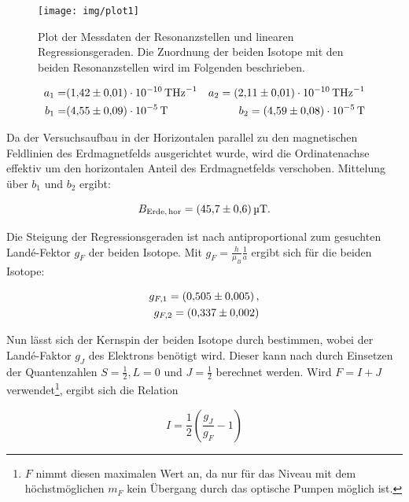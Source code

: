 \begin{figure}
	\centering
	\caption{Plot der Messdaten der Resonanzstellen und linearen Regressionsgeraden. Die Zuordnung der beiden Isotope mit den beiden Resonanzstellen wird im Folgenden beschrieben.}
	\texttt{[image: img/plot1]}
	\label{fig:plot1}
\end{figure}





\begin{eqnarray}
	a_1 =& \SI{1.42 \pm 0.01 e-10}{\tesla \hertz^{-1}} &a_2 =  \SI{2.11 \pm 0.01 e-10}{\tesla \hertz^{-1}}\\
	b_1 =& \SI{4.55 \pm 0.09 e-5}{\tesla}  &b_2 = \SI{4.59 \pm 0.08 e-5}{\tesla} 
\end{eqnarray}

Da der Versuchsaufbau in der Horizontalen parallel zu den magnetischen Feldlinien des Erdmagnetfelds ausgerichtet wurde, wird die Ordinatenachse effektiv um den horizontalen Anteil des Erdmagnetfelds verschoben. Mittelung über $b_1$ und $b_2$ ergibt:

\begin{equation}
	B_\text{Erde,\,hor} = \SI{45.7\pm 0.6}{\micro \tesla}.
\end{equation}

Die Steigung der Regressionsgeraden ist nach \color{red}{Gleichung ABC} antiproportional zum gesuchten Landé-Fektor $g_F$ der beiden Isotope. Mit $g_F = \frac{h}{\mu_B} \frac{1}{a}$ ergibt sich für die beiden Isotope:

\begin{eqnarray}
	g_{F,1} = \SI{0.505 \pm 0.005},\\
	g_{F,2} = \SI{0.337 \pm 0.002}.
\end{eqnarray}

Nun lässt sich der Kernspin der beiden Isotope durch \color{red}{Gleichung DEF} bestimmen, wobei der Landé-Faktor $g_J$ des Elektrons benötigt wird. Dieser kann nach \color{red}{Gleichung GHI} durch Einsetzen der Quantenzahlen $S = \frac{1}{2}, L = 0$ und $J = \frac{1}{2}$ berechnet werden. Wird $F = I + J$ verwendet\footnote{$F$ nimmt diesen maximalen Wert an, da nur für das Niveau mit dem höchstmöglichen $m_F$ kein Übergang durch das optische Pumpen möglich ist.}, ergibt sich die Relation

\begin{equation}
	I = \frac{1}{2} \left(\frac{g_J}{g_F} - 1\right)
\end{equation}

